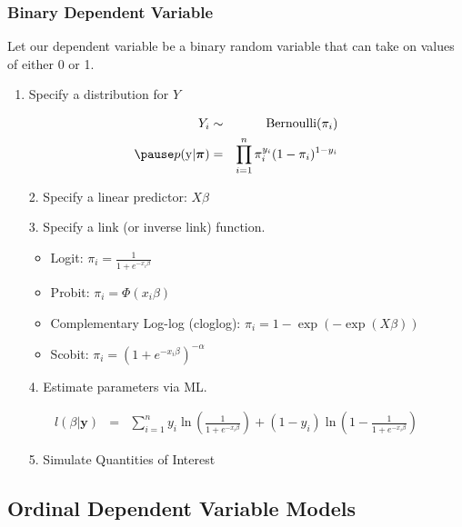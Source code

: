 \documentclass[handout]{beamer}
\begin{document}
\begin{frame}
\frametitle{Binary Dependent Variable}
Let our dependent variable be a binary random variable that can take
on values of either 0 or 1.
\end{frame}

\begin{frame}
\begin{enumerate}
\item Specify a distribution for $Y$
\end{enumerate}
\pause
\begin{eqnarray*}
Y_i &\sim& \mathrm{Bernoulli}(\pi_i) \\
\pause
p(\mathrm{y} | \bm{\pi}) &=& \prod^n_{i=1} \pi_i^{y_i} (1-\pi_i)^{1-y_i}
\end{eqnarray*}
\pause
\begin{itemize}
\item[2.] Specify a linear predictor: \pause $X\beta$
\end{itemize}
\end{frame}

\begin{frame}
\begin{itemize}
\item[3.] Specify a link (or inverse link) function.
\pause
\begin{itemize}
\item Logit: $\pi_i = \frac{1}{1+e^{-x_i\beta}}$
\pause
\item Probit: $\pi_i = \Phi(x_i \beta)$
\pause
\item Complementary Log-log (cloglog): $\pi_i = 1 - \exp(-\exp(X\beta))$
\pause
\item Scobit: $\pi_i = (1+e^{-x_i \beta})^{-\alpha}$
\end{itemize}
\pause
\bigskip
\item[4.] Estimate parameters via ML.
\pause
\end{itemize}
\begin{eqnarray*}
l(\beta | \mathbf{y}) &=& \sum^n_{i=1} y_i \; \mathrm{ln} \,
\left(\frac{1}{1+e^{-x_i\beta}}\right) + (1-y_i) \; \mathrm{ln} \, \left(1-\frac{1}{1+e^{-x_i\beta}}\right)
\end{eqnarray*}
\pause
\begin{itemize}
\item[5.] Simulate Quantities of Interest
\end{itemize}
\end{frame}

\subsection{Ordinal Dependent Variable Models}
\end{document}
